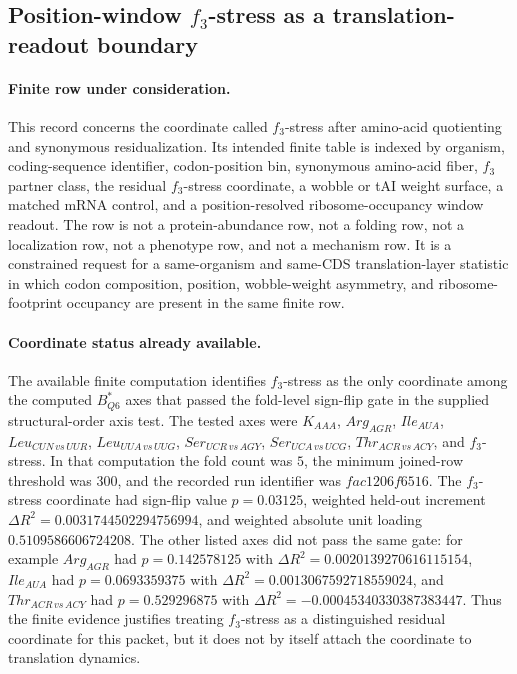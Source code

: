 \subsection{Position-window $f_3$-stress as a translation-readout boundary}
\label{sec:q6-f3-stress-position-window-ribosome-occupancy-translation-boundary}

\paragraph{Finite row under consideration.}
This record concerns the coordinate called $f_3$-stress after amino-acid quotienting and synonymous residualization.  Its intended finite table is indexed by organism, coding-sequence identifier, codon-position bin, synonymous amino-acid fiber, $f_3$ partner class, the residual $f_3$-stress coordinate, a wobble or tAI weight surface, a matched mRNA control, and a position-resolved ribosome-occupancy window readout.  The row is not a protein-abundance row, not a folding row, not a localization row, not a phenotype row, and not a mechanism row.  It is a constrained request for a same-organism and same-CDS translation-layer statistic in which codon composition, position, wobble-weight asymmetry, and ribosome-footprint occupancy are present in the same finite row.

\paragraph{Coordinate status already available.}
The available finite computation identifies $f_3$-stress as the only coordinate among the computed $B^\ast_{Q6}$ axes that passed the fold-level sign-flip gate in the supplied structural-order axis test.  The tested axes were $K_{AAA}$, $Arg_{AGR}$, $Ile_{AUA}$, $Leu_{CUN\,vs\,UUR}$, $Leu_{UUA\,vs\,UUG}$, $Ser_{UCR\,vs\,AGY}$, $Ser_{UCA\,vs\,UCG}$, $Thr_{ACR\,vs\,ACY}$, and $f_3$-stress.  In that computation the fold count was $5$, the minimum joined-row threshold was $300$, and the recorded run identifier was $fac1206f6516$.  The $f_3$-stress coordinate had sign-flip value $p=0.03125$, weighted held-out increment $\Delta R^2=0.0031744502294756994$, and weighted absolute unit loading $0.5109586606724208$.  The other listed axes did not pass the same gate: for example $Arg_{AGR}$ had $p=0.142578125$ with $\Delta R^2=0.0020139270616115154$, $Ile_{AUA}$ had $p=0.0693359375$ with $\Delta R^2=0.0013067592718559024$, and $Thr_{ACR\,vs\,ACY}$ had $p=0.529296875$ with $\Delta R^2=-0.00045340330387383447$.  Thus the finite evidence justifies treating $f_3$-stress as a distinguished residual coordinate for this packet, but it does not by itself attach the coordinate to translation dynamics.

